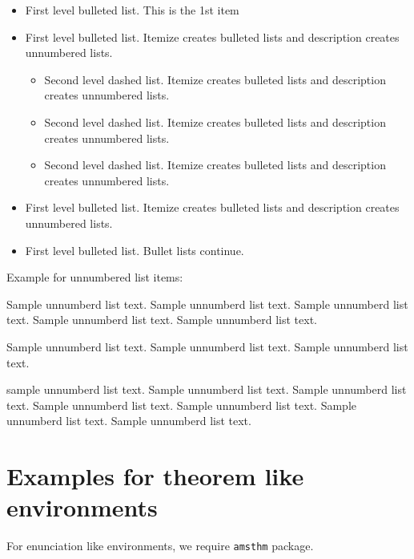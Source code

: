 \documentclass[numbers,webpdf]{ima-authoring-template}%
\theoremstyle{thmstyletwo}%
\numberwithin{equation}{section}
\begin{document}
\begin{itemize}
\item First level bulleted list. This is the 1st item

\item First level bulleted list. Itemize creates bulleted lists and description creates unnumbered lists.
\begin{itemize}
\item Second level dashed list. Itemize creates bulleted lists and description creates unnumbered lists.

\item Second level dashed list. Itemize creates bulleted lists and description creates unnumbered lists.

\item Second level dashed list. Itemize creates bulleted lists and description creates unnumbered lists.
\end{itemize}

\item First level bulleted list. Itemize creates bulleted lists and description creates unnumbered lists.

\item First level bulleted list. Bullet lists continue.
\end{itemize}

\noindent
Example for unnumbered list items:

\begin{unlist}
\item Sample unnumberd list text. Sample unnumberd list text. Sample unnumberd list text. Sample unnumberd list text. Sample unnumberd list text.

\item Sample unnumberd list text. Sample unnumberd list text. Sample unnumberd list text.

\item sample unnumberd list text. Sample unnumberd list text. Sample unnumberd list text. Sample unnumberd list text. Sample unnumberd list text. Sample unnumberd list text. Sample unnumberd list text.
\end{unlist}

\section{Examples for theorem like environments}\label{sec10}

For enunciation like environments, we require \verb+amsthm+ package. 
\end{document}
